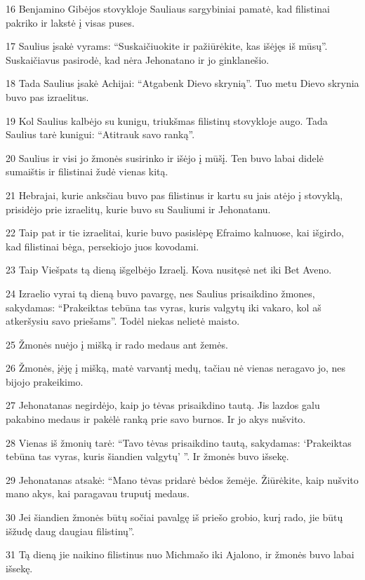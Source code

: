 \par 16 Benjamino Gibėjos stovykloje Sauliaus sargybiniai pamatė, kad filistinai pakriko ir lakstė į visas puses. 
\par 17 Saulius įsakė vyrams: “Suskaičiuokite ir pažiūrėkite, kas išėjęs iš mūsų”. Suskaičiavus pasirodė, kad nėra Jehonatano ir jo ginklanešio. 
\par 18 Tada Saulius įsakė Achijai: “Atgabenk Dievo skrynią”. Tuo metu Dievo skrynia buvo pas izraelitus. 
\par 19 Kol Saulius kalbėjo su kunigu, triukšmas filistinų stovykloje augo. Tada Saulius tarė kunigui: “Atitrauk savo ranką”. 
\par 20 Saulius ir visi jo žmonės susirinko ir išėjo į mūšį. Ten buvo labai didelė sumaištis ir filistinai žudė vienas kitą. 
\par 21 Hebrajai, kurie anksčiau buvo pas filistinus ir kartu su jais atėjo į stovyklą, prisidėjo prie izraelitų, kurie buvo su Sauliumi ir Jehonatanu. 
\par 22 Taip pat ir tie izraelitai, kurie buvo pasislėpę Efraimo kalnuose, kai išgirdo, kad filistinai bėga, persekiojo juos kovodami. 
\par 23 Taip Viešpats tą dieną išgelbėjo Izraelį. Kova nusitęsė net iki Bet Aveno. 
\par 24 Izraelio vyrai tą dieną buvo pavargę, nes Saulius prisaikdino žmones, sakydamas: “Prakeiktas tebūna tas vyras, kuris valgytų iki vakaro, kol aš atkeršysiu savo priešams”. Todėl niekas nelietė maisto. 
\par 25 Žmonės nuėjo į mišką ir rado medaus ant žemės. 
\par 26 Žmonės, įėję į mišką, matė varvantį medų, tačiau nė vienas neragavo jo, nes bijojo prakeikimo. 
\par 27 Jehonatanas negirdėjo, kaip jo tėvas prisaikdino tautą. Jis lazdos galu pakabino medaus ir pakėlė ranką prie savo burnos. Ir jo akys nušvito. 
\par 28 Vienas iš žmonių tarė: “Tavo tėvas prisaikdino tautą, sakydamas: ‘Prakeiktas tebūna tas vyras, kuris šiandien valgytų’ ”. Ir žmonės buvo išsekę. 
\par 29 Jehonatanas atsakė: “Mano tėvas pridarė bėdos žemėje. Žiūrėkite, kaip nušvito mano akys, kai paragavau truputį medaus. 
\par 30 Jei šiandien žmonės būtų sočiai pavalgę iš priešo grobio, kurį rado, jie būtų išžudę daug daugiau filistinų”. 
\par 31 Tą dieną jie naikino filistinus nuo Michmašo iki Ajalono, ir žmonės buvo labai išsekę. 

